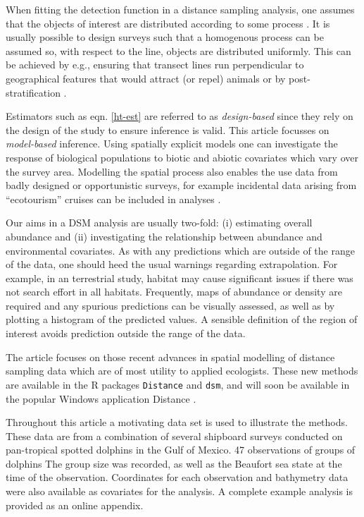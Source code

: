\documentclass[a4paper,12pt]{article}
\begin{document}
When fitting the detection function in a distance sampling analysis, one assumes that the objects of interest are distributed according to some process \citep[Section 2.1]{Buckland:2001vm}. It is usually possible to design surveys such that a homogenous process can be assumed so, with respect to the line, objects are distributed uniformly. This can be achieved by e.g., ensuring that transect lines run perpendicular to geographical features that would attract (or repel) animals or by post-stratification \citep[Section 3.7]{Buckland:2001vm}. 

Estimators such as eqn. \ref{ht-est} are referred to as \textit{design-based} since they rely on the design of the study to ensure inference is valid. This article focusses on \textit{model-based} inference. Using spatially explicit models one can investigate the response of biological populations to biotic and abiotic covariates which vary over the survey area. Modelling the spatial process also enables the use data from badly designed or opportunistic surveys, for example incidental data arising from ``ecotourism'' cruises can be included in analyses \citep{Williams:2006tz}. 

Our aims in a DSM analysis are usually two-fold: (i) estimating overall abundance and (ii) investigating the relationship between abundance and environmental covariates. As with any predictions which are outside of the range of the data, one should heed the usual warnings regarding extrapolation. For example, in an terrestrial study, habitat may cause significant issues if there was not search effort in all habitats. Frequently, maps of abundance or density are required and any spurious predictions can be visually assessed, as well as by plotting a histogram of the predicted values. A sensible definition of the region of interest avoids prediction outside the range of the data.

The article focuses on those recent advances in spatial modelling of distance sampling data which are of most utility to applied ecologists. These new methods are available in the \textsf{R} packages \texttt{Distance} and \texttt{dsm}, and will soon be available in the popular Windows application Distance \citep{Thomas:2010cf}.

Throughout this article a motivating data set is used to illustrate the methods. These data are from a combination of several shipboard surveys conducted on pan-tropical spotted dolphins in the Gulf of Mexico. 47 observations of groups of dolphins The group size was recorded, as well as the Beaufort sea state at the time of the observation. Coordinates for each observation and bathymetry data were also available as covariates for the analysis. A complete example analysis is provided as an online appendix.
\end{document}
